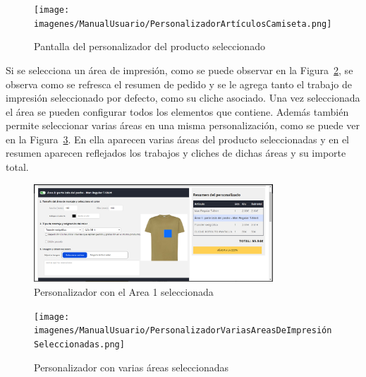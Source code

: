 \documentclass[11pt]{article}
\begin{document}
\begin{figure}[H]
    \centering
    \texttt{[image: imagenes/ManualUsuario/PersonalizadorArtículosCamiseta.png]}
    \caption{\label{fig:Personalizador}Pantalla del personalizador del producto seleccionado}
    \vspace{\fill}
\end{figure}

Si se selecciona un área de impresión, como se puede observar en la Figura~\ref{fig:PersonalizadorAreaMarcada}, se observa como se refresca el resumen de pedido y se le agrega tanto el trabajo de impresión
seleccionado por defecto, como su cliche asociado. Una vez seleccionada el área se pueden configurar todos los elementos que contiene. Además también permite seleccionar varias áreas en una misma personalización, como 
se puede ver en la Figura~\ref{fig:PersonalizadorVariasAreas}. En ella aparecen varias áreas del producto seleccionadas y en el resumen aparecen reflejados los trabajos y cliches de dichas áreas y su importe total.

\begin{figure}[H]
    \centering
    \includegraphics[width=0.8\textwidth]{imagenes/ManualUsuario/PersonalizadorArea1Seleccionada.png}
    \caption{\label{fig:PersonalizadorAreaMarcada}Personalizador con el Area 1 seleccionada}
    \vspace{\fill}
\end{figure}

\begin{figure}[H]
    \centering
    \texttt{[image: imagenes/ManualUsuario/PersonalizadorVariasAreasDeImpresiónSeleccionadas.png]}
    \caption{\label{fig:PersonalizadorVariasAreas}Personalizador con varias áreas seleccionadas}
    \vspace{\fill}
\end{figure}
\end{document}
